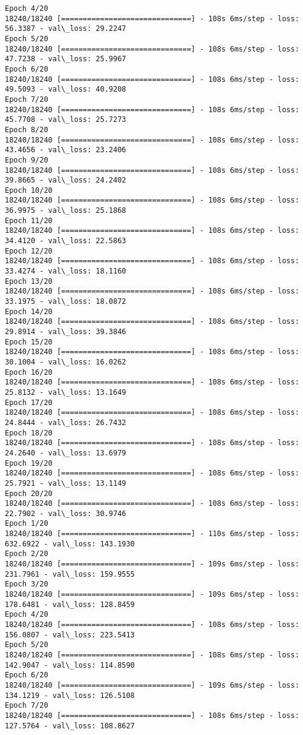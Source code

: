 \documentclass[11pt]{article}
\begin{document}
\begin{Verbatim}[commandchars=\\\{\}]
Epoch 4/20
18240/18240 [==============================] - 108s 6ms/step - loss: 56.3387 - val\_loss: 29.2247
Epoch 5/20
18240/18240 [==============================] - 108s 6ms/step - loss: 47.7238 - val\_loss: 25.9967
Epoch 6/20
18240/18240 [==============================] - 108s 6ms/step - loss: 49.5093 - val\_loss: 40.9208
Epoch 7/20
18240/18240 [==============================] - 108s 6ms/step - loss: 45.7708 - val\_loss: 25.7273
Epoch 8/20
18240/18240 [==============================] - 108s 6ms/step - loss: 43.4656 - val\_loss: 23.2406
Epoch 9/20
18240/18240 [==============================] - 108s 6ms/step - loss: 39.8665 - val\_loss: 24.2402
Epoch 10/20
18240/18240 [==============================] - 108s 6ms/step - loss: 36.9975 - val\_loss: 25.1868
Epoch 11/20
18240/18240 [==============================] - 108s 6ms/step - loss: 34.4120 - val\_loss: 22.5863
Epoch 12/20
18240/18240 [==============================] - 108s 6ms/step - loss: 33.4274 - val\_loss: 18.1160
Epoch 13/20
18240/18240 [==============================] - 108s 6ms/step - loss: 33.1975 - val\_loss: 18.0872
Epoch 14/20
18240/18240 [==============================] - 108s 6ms/step - loss: 29.8914 - val\_loss: 39.3846
Epoch 15/20
18240/18240 [==============================] - 108s 6ms/step - loss: 30.1004 - val\_loss: 16.0262
Epoch 16/20
18240/18240 [==============================] - 108s 6ms/step - loss: 25.8132 - val\_loss: 13.1649
Epoch 17/20
18240/18240 [==============================] - 108s 6ms/step - loss: 24.8444 - val\_loss: 26.7432
Epoch 18/20
18240/18240 [==============================] - 108s 6ms/step - loss: 24.2640 - val\_loss: 13.6979
Epoch 19/20
18240/18240 [==============================] - 108s 6ms/step - loss: 25.7921 - val\_loss: 13.1149
Epoch 20/20
18240/18240 [==============================] - 108s 6ms/step - loss: 22.7902 - val\_loss: 30.9746
Epoch 1/20
18240/18240 [==============================] - 110s 6ms/step - loss: 632.6922 - val\_loss: 143.1930
Epoch 2/20
18240/18240 [==============================] - 109s 6ms/step - loss: 231.7961 - val\_loss: 159.9555
Epoch 3/20
18240/18240 [==============================] - 109s 6ms/step - loss: 178.6481 - val\_loss: 128.8459
Epoch 4/20
18240/18240 [==============================] - 108s 6ms/step - loss: 156.0807 - val\_loss: 223.5413
Epoch 5/20
18240/18240 [==============================] - 108s 6ms/step - loss: 142.9047 - val\_loss: 114.8590
Epoch 6/20
18240/18240 [==============================] - 109s 6ms/step - loss: 134.1219 - val\_loss: 126.5108
Epoch 7/20
18240/18240 [==============================] - 108s 6ms/step - loss: 127.5764 - val\_loss: 108.8627

\end{Verbatim}
\end{document}
